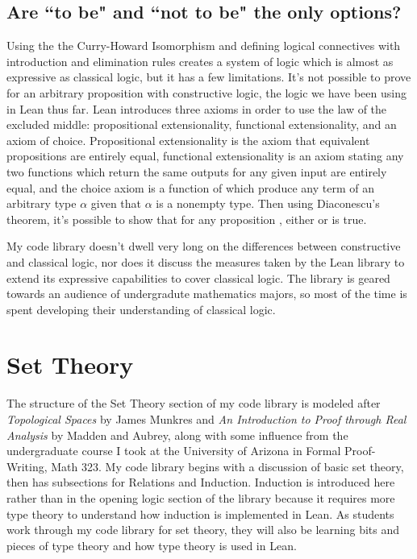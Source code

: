 \subsection{Are ``to be" and ``not to be" the only options?}

Using the the Curry-Howard Isomorphism and defining logical connectives
with introduction and elimination rules creates a system of logic which
is almost as expressive as classical logic, but it has a few limitations.
It's not possible to prove  for an arbitrary proposition 
with constructive logic, the logic we have been using in Lean thus far.
Lean introduces three axioms in order to use the law of the
excluded middle: propositional extensionality, functional
extensionality, and an axiom of choice. Propositional extensionality is the
axiom that equivalent propositions are entirely equal, functional extensionality
is an axiom stating any two functions which return the same outputs for any
given input are entirely equal, and the choice axiom is a function of which produce
any term of an arbitrary type $\alpha$ given that $\alpha$ is a nonempty
type. Then using Diaconescu's theorem, it's possible to show that for any
proposition , either  or  is true. 

My code library doesn't dwell very long on the differences between 
constructive and classical logic, nor does it discuss the measures
taken by the Lean library to extend its expressive capabilities to 
cover classical logic. The library is geared towards an audience of 
undergradute mathematics majors, so most of the time is spent developing
their understanding of classical logic.

\section{Set Theory}

The structure of the Set Theory section of my code library is modeled after 
\textit{Topological Spaces} by James Munkres and 
\textit{An Introduction to Proof through Real Analysis} by Madden and Aubrey, along with
some influence from the undergraduate course I took at the University of Arizona
in Formal Proof-Writing, Math 323. My code library begins with a discussion of basic
set theory, then has subsections for Relations and Induction. 
Induction is introduced here rather than in the opening logic section of the 
library because it requires more type theory to understand how induction is
implemented in Lean. As students work through my code library for set theory,
they will also be learning bits and pieces of type theory and how type theory
is used in Lean. 

